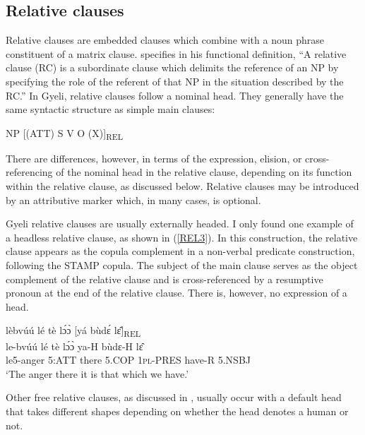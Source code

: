 \subsection{Relative clauses}
\label{sec:Relativeclauses}

Relative clauses are embedded clauses which combine with a noun phrase constituent of a matrix clause. \citet[206]{andrews2007} specifies in his functional definition,
``A relative clause (RC) is a subordinate clause which delimits the reference of an NP by specifying the role of the referent of that NP in the situation described by the RC.'' 
In Gyeli, relative clauses follow a nominal head. They generally have the same syntactic structure as simple main clauses:

\begin{center}
NP [(ATT) S V O (X)]\textsubscript{REL}
\end{center} 

\noindent There are differences, however, in terms of the expression, elision, or cross-referencing of the nominal head in the relative clause, depending on its function within the relative clause, as discussed below.  Relative clauses may be introduced by an attributive marker which, in many cases, is optional. 

Gyeli relative clauses are usually externally headed. I only found one example of a headless relative clause, as shown in (\ref{REL3}). In this construction, the relative clause appears as the copula complement in a non-verbal predicate construction, following the STAMP copula. The subject of the main clause serves as the object complement of the relative clause and is cross-referenced by a resumptive pronoun at the end of the relative clause. There is, however, no expression of a head.

\begin{exe} 
\ex\label{REL3} 
  \glll  lèbvúú  lé tè lɔ́ɔ̀ [yá bùdɛ́ lɛ̂]\textsubscript{REL} \\
         le-bvúú  lé tè lɔ́ɔ̀ ya-H bùdɛ-H lɛ̂ \\
         le5-anger 5:ATT there 5.COP 1\textsc{pl}-PRES have-R 5.NSBJ    \\
    \trans `The anger there it is that which we have.'
\end{exe}

\noindent Other free relative clauses, as discussed in , usually occur with a default head that takes different shapes depending on whether the head denotes a human or not.


